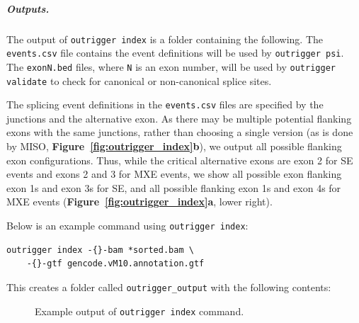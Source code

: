 \subparagraph{Outputs.} The output of \texttt{outrigger index} is a folder containing the following. The \texttt{events.csv} file contains the event definitions will be used by \texttt{outrigger psi}. The \texttt{exonN.bed} files, where \texttt{N} is an exon number, will be used by \texttt{outrigger validate} to check for canonical or non-canonical splice sites.

The splicing event definitions in the \texttt{events.csv} files are specified by the junctions and the alternative exon. As there may be multiple potential flanking exons with the same junctions, rather than choosing a single version (as is done by MISO, \textbf{Figure~\ref{fig:outrigger_index}b}), we output all possible flanking exon configurations. Thus, while the critical alternative exons are exon 2 for SE events and exons 2 and 3 for MXE events, we show all possible exon flanking exon 1s and exon 3s for SE, and all possible flanking exon 1s and exon 4s for MXE events (\textbf{Figure~\ref{fig:outrigger_index}a}, lower right).

Below is an example command using \texttt{outrigger index}:

\begin{verbatim}
outrigger index -{}-bam *sorted.bam \
    -{}-gtf gencode.vM10.annotation.gtf
\end{verbatim}

This creates a folder called \texttt{outrigger\_output} with the following contents:


\begin{figure}
\caption{Example output of \texttt{outrigger index} command.}
\end{figure}

